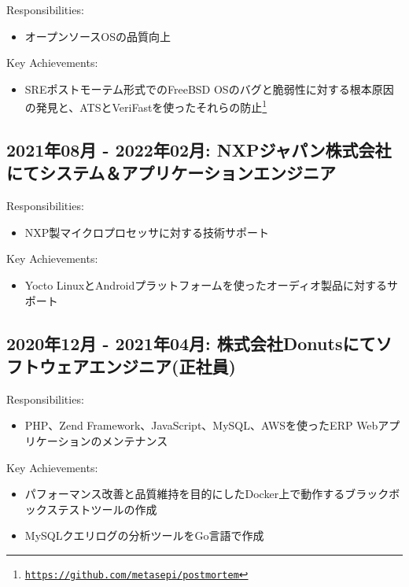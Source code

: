\documentclass[letterpaper]{article}
\begin{document}
\noindent Responsibilities:

\begin{itemize}
  \item オープンソースOSの品質向上
\end{itemize}

\noindent Key Achievements:

\begin{itemize}
  \item SREポストモーテム形式でのFreeBSD OSのバグと脆弱性に対する根本原因の発見と、ATSとVeriFastを使ったそれらの防止\footnote{\href{https://github.com/metasepi/postmortem}{\tt https://github.com/metasepi/postmortem}}
\end{itemize}

\subsection*{2021年08月 - 2022年02月: NXPジャパン株式会社にてシステム＆アプリケーションエンジニア}

\noindent Responsibilities:

\begin{itemize}
  \item NXP製マイクロプロセッサに対する技術サポート
\end{itemize}

\noindent Key Achievements:

\begin{itemize}
  \item Yocto LinuxとAndroidプラットフォームを使ったオーディオ製品に対するサポート
\end{itemize}

\subsection*{2020年12月 - 2021年04月: 株式会社Donutsにてソフトウェアエンジニア(正社員)}

\noindent Responsibilities:

\begin{itemize}
  \item PHP、Zend Framework、JavaScript、MySQL、AWSを使ったERP Webアプリケーションのメンテナンス
\end{itemize}

\noindent Key Achievements:

\begin{itemize}
  \item パフォーマンス改善と品質維持を目的にしたDocker上で動作するブラックボックステストツールの作成
  \item MySQLクエリログの分析ツールをGo言語で作成
\end{itemize}
\end{document}
